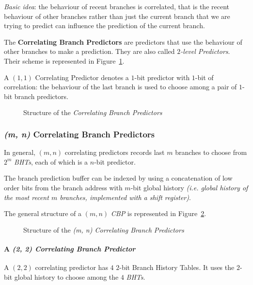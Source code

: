 \documentclass[english]{article}
\begin{document}
\textit{Basic idea}: the behaviour of recent branches is correlated, that is the recent behaviour of other branches rather than just the current branch that we are trying to predict can influence the prediction of the current branch.

The \textbf{Correlating Branch Predictors} are predictors that use the behaviour of other branches to make a prediction.
They are also called \textit{\(2\)-level Predictors}.
Their scheme is represented in Figure~\ref{fig:structure-of-CBP}.

A \((1, 1)\) Correlating Predictor denotes a \(1\)-bit predictor with \(1\)-bit of correlation: the behaviour of the last branch is used to choose among a pair of \(1\)-bit branch predictors.

\begin{figure}[htbp]
  \bigskip
  \centering
  \caption{Structure of the \textit{Correlating Branch Predictors}}
  \label{fig:structure-of-CBP}
  \bigskip
\end{figure}

\subsubsection{\textit{(m, n)} Correlating Branch Predictors}

In general, \((m, n)\) correlating predictors records last \(m\) branches to choose from \(2^m\) \textit{BHTs}, each of which is a \(n\)-bit predictor.

The branch prediction buffer can be indexed by using a concatenation of low order bits from the branch address with \(m\)-bit global history \textit{(i.e. global history of the most recent \(m\) branches, implemented with a shift register)}.

The general structure of a \((m, n)\) \textit{CBP} is represented in Figure~\ref{fig:m-n-CBP}.

\begin{figure}[htbp]
  \bigskip
  \centering
  \caption{Structure of the \textit{(m, n) Correlating Branch Predictors}}
  \label{fig:m-n-CBP}
  \bigskip
\end{figure}

\paragraph{A \textit{(2, 2) Correlating Branch Predictor}}

A \((2, 2)\) correlating predictor has \(4\) \(2\)-bit Branch History Tables.
It uses the \(2\)-bit global history to choose among the \(4\) \textit{BHTs}.
\end{document}
